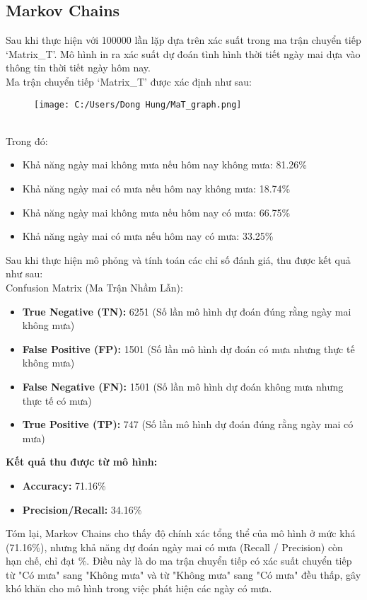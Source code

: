 \documentclass[conference]{IEEEtran}
\begin{document}
\subsection {Markov Chains}
\indent Sau khi thực hiện với 100000 lần lặp dựa trên xác suất trong ma trận chuyển tiếp `Matrix\_T'. Mô hình in ra xác suất dự đoán tình hình thời tiết ngày mai dựa vào thông tin thời tiết ngày hôm nay.
\\
\indent Ma trận chuyển tiếp `Matrix\_T' được xác định như sau:
\\
\begin{figure}[ht]
    \centering
    \texttt{[image: C:/Users/Dong Hung/MaT\_graph.png]}
    \label{fig:my_label}
\end{figure}\\
Trong đó:
\begin{itemize}
    \item Khả năng ngày mai không mưa nếu hôm nay không mưa: 81.26\%
    \item Khả năng ngày mai có mưa nếu hôm nay không mưa: 18.74\%
    \item Khả năng ngày mai không mưa nếu hôm nay có mưa: 66.75\%
    \item Khả năng ngày mai có mưa nếu hôm nay có mưa: 33.25\%
\end{itemize}
\indent Sau khi thực hiện mô phỏng và tính toán các chỉ số đánh giá, thu được kết quả như sau:\\
Confusion Matrix (Ma Trận Nhầm Lẫn):
\begin{itemize}
    \item \textbf{True Negative (TN):} 6251 (Số lần mô hình dự đoán đúng rằng ngày mai không mưa)
    \item \textbf{False Positive (FP):} 1501 (Số lần mô hình dự đoán có mưa nhưng thực tế không mưa)
    \item \textbf{False Negative (FN):} 1501 (Số lần mô hình dự đoán không mưa nhưng thực tế có mưa)
    \item \textbf{True Positive (TP):} 747 (Số lần mô hình dự đoán đúng rằng ngày mai có mưa)
\end{itemize}
\noindent\textbf{Kết quả thu được từ mô hình:}
\begin{itemize}
    \item\textbf{Accuracy:} 71.16\%
    \item\textbf{Precision/Recall:} 34.16\%
\end{itemize}
\hspace{0.3cm} Tóm lại, Markov Chains cho thấy độ chính xác tổng thể của mô hình ở mức khá (71.16\%), nhưng khả năng dự đoán ngày mai có mưa (Recall / Precision) còn hạn chế, chỉ đạt \%. Điều này là do ma trận chuyển tiếp có xác suất chuyển tiếp từ "Có mưa" sang "Không mưa" và từ "Không mưa" sang "Có mưa" đều thấp, gây khó khăn cho mô hình trong việc phát hiện các ngày có mưa.
\end{document}
